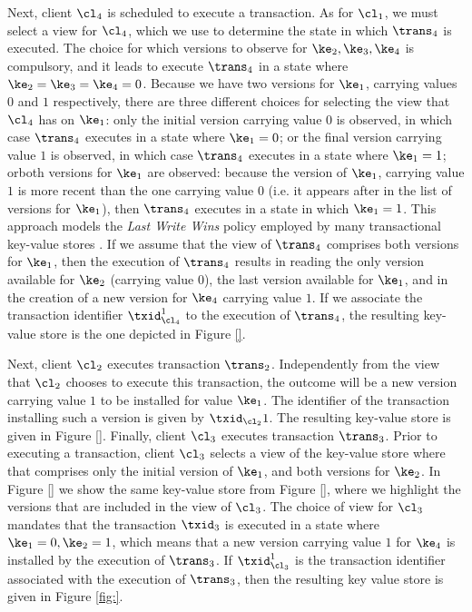 Next, client $\cl_4$ is scheduled to execute a transaction. As for $\cl_1$, 
we must select a view for $\cl_4$, which we use to determine the state in which $\trans_4$ 
is executed. The choice for which versions to observe for $\ke_2, \ke_3, \ke_4$ is compulsory, 
and it leads to execute $\trans_4$ in a state where $\ke_2 = \ke_3 = \ke_4 = 0$.
Because we have two versions for $\ke_1$, carrying values $0$ and $1$ respectively, 
there are three different choices for selecting the view that $\cl_4$ has on $\ke_1$: 
only the initial version carrying value $0$ is observed, in which case $\trans_4$ executes in 
a state where $\ke_1 = 0$; or the final version carrying value $1$ is observed, in which 
case $\trans_4$ executes in a state where $\ke_1 = 1$; orboth versions for 
$\ke_1$ are observed: because the version of $\ke_1$, carrying value $1$ is more recent than the one 
carrying value $0$ (i.e. it appears after in the list of versions for $\ke_1$), then $\trans_4$ 
executes in a state in which $\ke_1 = 1$. This approach models the \emph{Last Write Wins} 
policy employed by many transactional key-value stores \cite{}. If we assume that the view 
of $\trans_4$ comprises both versions for $\ke_1$, then the execution of $\trans_4$ 
results in reading the only version available for $\ke_2$ (carrying value $0$), the last version available 
for $\ke_1$, and in the creation of a new version for $\ke_4$ carrying value $1$. If we associate 
the transaction identifier $\txid_{\cl_{4}}^1$ to the execution of $\trans_4$, the resulting 
key-value store is the one depicted in Figure \ref{}.

Next, client $\cl_2$ executes transaction $\trans_2$. Independently from the view that 
$\cl_2$ chooses to execute this transaction, the outcome will be a new version carrying 
value $1$ to be installed for value $\ke_1$. The identifier of the transaction installing such 
a version is given by $\txid_{\cl_2}{1}$. The resulting key-value store is given in Figure \ref{}. 
Finally, client $\cl_3$ executes transaction $\trans_3$. Prior to executing a transaction, client 
$\cl_3$ selects a view of the key-value store where that comprises only the initial version of $\ke_1$, 
and both versions for $\ke_2$. In Figure \ref{} we show the same key-value store from Figure \ref{},  
where we highlight the versions that are included in the view of $\cl_3$. The choice of view for $\cl_3$ 
mandates that the transaction $\txid_3$ is executed in a state where $\ke_1 = 0, \ke_2 = 1$, which 
means that a new version carrying value $1$ for $\ke_4$ is installed by the execution of $\trans_3$. 
If $\txid_{\cl_3}^{1}$ is the transaction identifier associated with the execution of $\trans_3$, then the resulting 
key value store is given in Figure \ref{fig:}.


